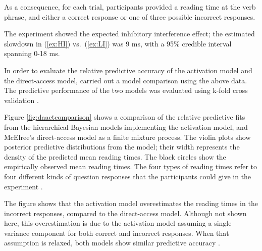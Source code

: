\documentclass{cambridge7A}\usepackage[]{graphicx}\usepackage[]{color}
\begin{document}
As a consequence, for each trial, participants provided a reading time at the verb phrase, and either a correct response or one of three possible incorrect responses. 

The experiment showed the expected inhibitory interference effect; the estimated slowdown in (\ref{ex:HI}) vs.\ (\ref{ex:LI}) was 9 ms, with a 95\% credible interval spanning 0-18 ms.  

In order to evaluate the relative predictive accuracy of the activation model and the direct-access model, \cite{NicenboimRetrieval2018} carried out a model comparison using the above data. The predictive performance of the two models was evaluated using k-fold cross validation \citep{vehtari2012survey,vehtari2016LOOwaic}.  



Figure \ref{fig:daactcomparison} shows a comparison of the relative predictive fits from the hierarchical Bayesian models implementing the activation model, and McElree's direct-access model as a finite mixture process. The violin plots show posterior predictive distributions from the model; their width represents the density of the predicted mean reading times. The black circles show the empirically observed mean reading times. The four types of reading times refer to four different kinds of question responses that the participants could give in the experiment \citep{nicenboimexploratory}. 

The figure shows that the activation model overestimates the reading times in the incorrect responses, compared to the direct-access model. Although not shown here, this overestimation is due to the activation model assuming a single variance component for both correct and incorrect responses. When that assumption is relaxed, both models show similar predictive accuracy \citep{NicenboimRetrieval2018}.
\end{document}
